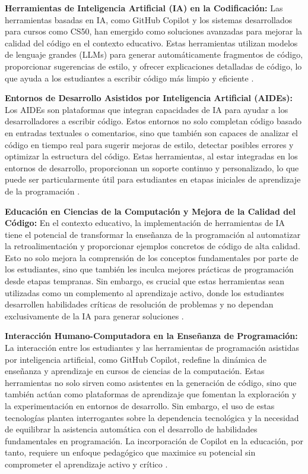 \documentclass[a4paper,10pt]{article}
\begin{document}
\textbf{Herramientas de Inteligencia Artificial (IA) en la Codificación:} Las herramientas basadas en IA, como GitHub Copilot y los sistemas desarrollados para cursos como CS50, han emergido como soluciones avanzadas para mejorar la calidad del código en el contexto educativo. Estas herramientas utilizan modelos de lenguaje grandes (LLMs) para generar automáticamente fragmentos de código, proporcionar sugerencias de estilo, y ofrecer explicaciones detalladas de código, lo que ayuda a los estudiantes a escribir código más limpio y eficiente \cite{Liu2024TeachingCW}.

\textbf{Entornos de Desarrollo Asistidos por Inteligencia Artificial (AIDEs):} Los AIDEs son plataformas que integran capacidades de IA para ayudar a los desarrolladores a escribir código. Estos entornos no solo completan código basado en entradas textuales o comentarios, sino que también son capaces de analizar el código en tiempo real para sugerir mejoras de estilo, detectar posibles errores y optimizar la estructura del código. Estas herramientas, al estar integradas en los entornos de desarrollo, proporcionan un soporte continuo y personalizado, lo que puede ser particularmente útil para estudiantes en etapas iniciales de aprendizaje de la programación \cite{puryear2022github}.

\textbf{Educación en Ciencias de la Computación y Mejora de la Calidad del Código:} En el contexto educativo, la implementación de herramientas de IA tiene el potencial de transformar la enseñanza de la programación al automatizar la retroalimentación y proporcionar ejemplos concretos de código de alta calidad. Esto no solo mejora la comprensión de los conceptos fundamentales por parte de los estudiantes, sino que también les inculca mejores prácticas de programación desde etapas tempranas. Sin embargo, es crucial que estas herramientas sean utilizadas como un complemento al aprendizaje activo, donde los estudiantes desarrollen habilidades críticas de resolución de problemas y no dependan exclusivamente de la IA para generar soluciones \cite{Liu2024TeachingCW}.


\textbf{Interacción Humano-Computadora en la Enseñanza de Programación:} La interacción entre los estudiantes y las herramientas de programación asistidas por inteligencia artificial, como GitHub Copilot, redefine la dinámica de enseñanza y aprendizaje en cursos de ciencias de la computación. Estas herramientas no solo sirven como asistentes en la generación de código, sino que también actúan como plataformas de aprendizaje que fomentan la exploración y la experimentación en entornos de desarrollo. Sin embargo, el uso de estas tecnologías plantea interrogantes sobre la dependencia tecnológica y la necesidad de equilibrar la asistencia automática con el desarrollo de habilidades fundamentales en programación. La incorporación de Copilot en la educación, por tanto, requiere un enfoque pedagógico que maximice su potencial sin comprometer el aprendizaje activo y crítico \cite{menon2023exploring}.
\end{document}
